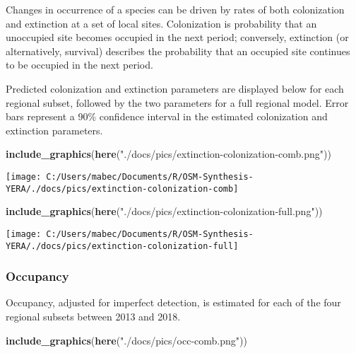 \documentclass[11pt,]{article}
\newenvironment{Shaded}{\begin{snugshade}}{\end{snugshade}}
\newcommand{\KeywordTok}[1]{\textcolor[rgb]{0.13,0.29,0.53}{\textbf{#1}}}
\newcommand{\StringTok}[1]{\textcolor[rgb]{0.31,0.60,0.02}{#1}}
\newcommand{\NormalTok}[1]{#1}
\begin{document}
Changes in occurrence of a species can be driven by rates of both
colonization and extinction at a set of local sites. Colonization is
probability that an unoccupied site becomes occupied in the next period;
conversely, extinction (or alternatively, survival) describes the
probability that an occupied site continues to be occupied in the next
period.

Predicted colonization and extinction parameters are displayed below for
each regional subset, followed by the two parameters for a full regional
model. Error bars represent a 90\% confidence interval in the estimated
colonization and extinction parameters.

\begin{Shaded}
\begin{Highlighting}[]
\KeywordTok{include_graphics}\NormalTok{(}\KeywordTok{here}\NormalTok{(}\StringTok{"./docs/pics/extinction-colonization-comb.png"}\NormalTok{))}
\end{Highlighting}
\end{Shaded}

\begin{center}\texttt{[image: C:/Users/mabec/Documents/R/OSM-Synthesis-YERA/./docs/pics/extinction-colonization-comb]} \end{center}

\begin{Shaded}
\begin{Highlighting}[]
\KeywordTok{include_graphics}\NormalTok{(}\KeywordTok{here}\NormalTok{(}\StringTok{"./docs/pics/extinction-colonization-full.png"}\NormalTok{))}
\end{Highlighting}
\end{Shaded}

\begin{center}\texttt{[image: C:/Users/mabec/Documents/R/OSM-Synthesis-YERA/./docs/pics/extinction-colonization-full]} \end{center}

\subsubsection{Occupancy}\label{occupancy}

Occupancy, adjusted for imperfect detection, is estimated for each of
the four regional subsets between 2013 and 2018.

\begin{Shaded}
\begin{Highlighting}[]
\KeywordTok{include_graphics}\NormalTok{(}\KeywordTok{here}\NormalTok{(}\StringTok{"./docs/pics/occ-comb.png"}\NormalTok{))}
\end{Highlighting}
\end{Shaded}
\end{document}

